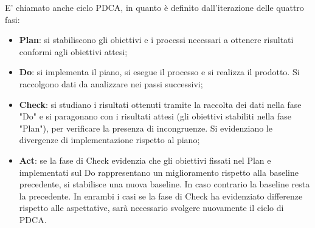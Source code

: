 E' chiamato anche ciclo PDCA, in quanto è definito dall'iterazione delle quattro fasi:
 
\begin{itemize}
\item 
\textbf{Plan}:
si stabiliscono gli obiettivi e i processi necessari a ottenere risultati conformi agli obiettivi attesi;
\item 
\textbf{Do}:
si implementa il piano, si esegue il processo e si realizza il prodotto. Si raccolgono dati da analizzare nei passi successivi;
\item
\textbf{Check}:
si studiano i risultati ottenuti tramite la raccolta dei dati nella fase "Do" e si paragonano con i risultati attesi (gli obiettivi stabiliti nella fase "Plan"), per verificare la presenza di incongruenze. Si evidenziano le divergenze di implementazione rispetto al piano;
\item 
\textbf{Act}:
se la fase di Check evidenzia che gli obiettivi fissati nel Plan e implementati sul Do rappresentano un miglioramento rispetto alla baseline precedente, si stabilisce una nuova baseline. In caso contrario la baseline resta la precedente. In enrambi i casi se la fase di Check ha evidenziato differenze rispetto alle aspettative, sarà necessario svolgere nuovamente il ciclo di PDCA.
\end{itemize}